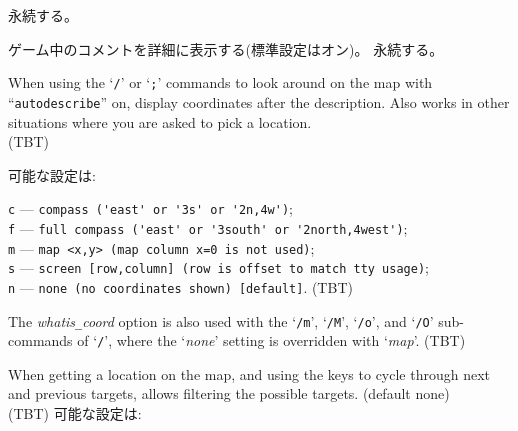 永続する。
\item[\ib{verbose}]
ゲーム中のコメントを詳細に表示する(標準設定はオン)。
永続する。
\item[\ib{whatis\verb+_+coord}]
When using the `{\tt /}' or `{\tt ;}' commands to look around on the map with
``{\tt autodescribe}''
on, display coordinates after the description.
Also works in other situations where you are asked to pick a location.\\
(TBT)

可能な設定は:

{\tt c} --- \verb#compass ('east' or '3s' or '2n,4w')#;\\
{\tt f} --- \verb#full compass ('east' or '3south' or '2north,4west')#;\\
{\tt m} --- \verb#map <x,y> (map column x=0 is not used)#;\\
{\tt s} --- \verb#screen [row,column] (row is offset to match tty usage)#;\\
{\tt n} --- \verb#none (no coordinates shown) [default]#.
(TBT)

The
{\it whatis\verb+_+coord\/}
option is also used with
the `{\tt /m}', `{\tt /M}', `{\tt /o}', and `{\tt /O}' sub-commands
of `{\tt /}',
where the `{\it none\/}' setting is overridden with `{\it map}'.
(TBT)
\item[\ib{whatis\verb+_+filter}]
When getting a location on the map, and using the keys to cycle through
next and previous targets, allows filtering the possible targets.
(default none)\\
(TBT)
可能な設定は:

